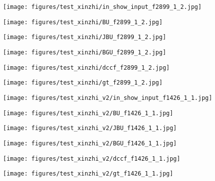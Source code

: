 \documentclass[runningheads]{llncs}
\begin{document}
\begin{figure*}[!thb]
        \begin{subfigure}[t]{0.15\linewidth}
            \centering
            \texttt{[image: figures/test\_xinzhi/in\_show\_input\_f2899\_1\_2.jpg]}
        \end{subfigure}
        \begin{subfigure}[t]{0.15\linewidth}
            \centering
            \texttt{[image: figures/test\_xinzhi/BU\_f2899\_1\_2.jpg]}
        \end{subfigure}
        \begin{subfigure}[t]{0.15\linewidth}
            \centering
            \texttt{[image: figures/test\_xinzhi/JBU\_f2899\_1\_2.jpg]}
        \end{subfigure}
        \begin{subfigure}[t]{0.15\linewidth}
            \centering
            \texttt{[image: figures/test\_xinzhi/BGU\_f2899\_1\_2.jpg]}
        \end{subfigure}
        \begin{subfigure}[t]{0.15\linewidth}
            \centering
            \texttt{[image: figures/test\_xinzhi/dccf\_f2899\_1\_2.jpg]}
        \end{subfigure}
        \begin{subfigure}[t]{0.15\linewidth}
            \centering
            \texttt{[image: figures/test\_xinzhi/gt\_f2899\_1\_2.jpg]}
        \end{subfigure}



        \begin{subfigure}[t]{0.15\linewidth}
            \centering
            \texttt{[image: figures/test\_xinzhi\_v2/in\_show\_input\_f1426\_1\_1.jpg]}
        \end{subfigure}
        \begin{subfigure}[t]{0.15\linewidth}
            \centering
            \texttt{[image: figures/test\_xinzhi\_v2/BU\_f1426\_1\_1.jpg]}
        \end{subfigure}
        \begin{subfigure}[t]{0.15\linewidth}
            \centering
            \texttt{[image: figures/test\_xinzhi\_v2/JBU\_f1426\_1\_1.jpg]}
        \end{subfigure}
        \begin{subfigure}[t]{0.15\linewidth}
            \centering
            \texttt{[image: figures/test\_xinzhi\_v2/BGU\_f1426\_1\_1.jpg]}
        \end{subfigure}
        \begin{subfigure}[t]{0.15\linewidth}
            \centering
            \texttt{[image: figures/test\_xinzhi\_v2/dccf\_f1426\_1\_1.jpg]}
        \end{subfigure}
        \begin{subfigure}[t]{0.15\linewidth}
            \centering
            \texttt{[image: figures/test\_xinzhi\_v2/gt\_f1426\_1\_1.jpg]}
        \end{subfigure}



\end{figure*}
\end{document}
